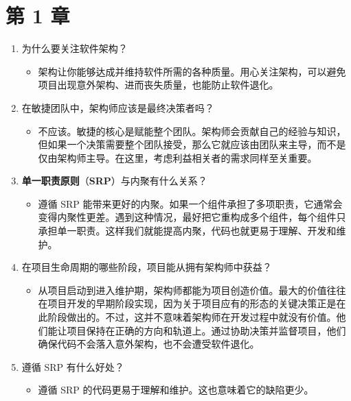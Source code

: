 \section*{第 1 章}

\begin{enumerate}
\item 为什么要关注软件架构？

\begin{itemize}
\item 架构让你能够达成并维持软件所需的各种质量。用心关注架构，可以避免项目出现意外架构、进而丧失质量，也能防止软件退化。
\end{itemize}
\item 在敏捷团队中，架构师应该是最终决策者吗？

\begin{itemize}
\item 不应该。敏捷的核心是赋能整个团队。架构师会贡献自己的经验与知识，但如果一个决策需要整个团队接受，那么它就应该由团队来主导，而不是仅由架构师主导。在这里，考虑利益相关者的需求同样至关重要。
\end{itemize}
\item \textbf{单一职责原则}（\textbf{SRP}）与内聚有什么关系？

\begin{itemize}
\item 遵循 SRP 能带来更好的内聚。如果一个组件承担了多项职责，它通常会变得内聚性更差。遇到这种情况，最好把它重构成多个组件，每个组件只承担单一职责。这样我们就能提高内聚，代码也就更易于理解、开发和维护。
\end{itemize}
\item 在项目生命周期的哪些阶段，项目能从拥有架构师中获益？

\begin{itemize}
\item 从项目启动到进入维护期，架构师都能为项目创造价值。最大的价值往往在项目开发的早期阶段实现，因为关于项目应有的形态的关键决策正是在此阶段做出的。不过，这并不意味着架构师在开发过程中就没有价值。他们能让项目保持在正确的方向和轨道上。通过协助决策并监督项目，他们确保代码不会落入意外架构，也不会遭受软件退化。
\end{itemize}
\item 遵循 SRP 有什么好处？

\begin{itemize}
\item 遵循 SRP 的代码更易于理解和维护。这也意味着它的缺陷更少。
\end{itemize}
\end{enumerate}

